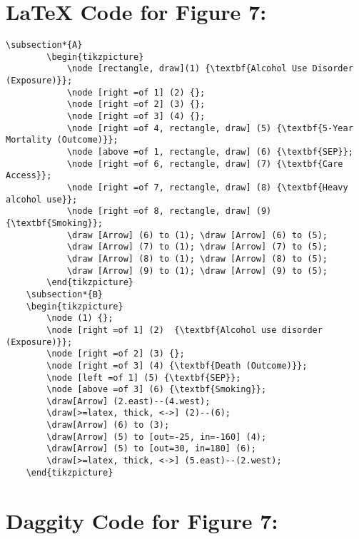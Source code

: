 \documentclass{article}
\begin{document}
\section*{\LaTeX\hspace*{1mm} Code for Figure 7:}
\begin{lstlisting}[frame=single, basicstyle=\ttfamily, linewidth=20.5cm]
        \subsection*{A}
        \begin{tikzpicture}
            \node [rectangle, draw](1) {\textbf{Alcohol Use Disorder (Exposure)}};
            \node [right =of 1] (2) {};
            \node [right =of 2] (3) {};
            \node [right =of 3] (4) {};
            \node [right =of 4, rectangle, draw] (5) {\textbf{5-Year Mortality (Outcome)}};
            \node [above =of 1, rectangle, draw] (6) {\textbf{SEP}};
            \node [right =of 6, rectangle, draw] (7) {\textbf{Care Access}};
            \node [right =of 7, rectangle, draw] (8) {\textbf{Heavy alcohol use}};
            \node [right =of 8, rectangle, draw] (9) {\textbf{Smoking}};
            \draw [Arrow] (6) to (1); \draw [Arrow] (6) to (5);
            \draw [Arrow] (7) to (1); \draw [Arrow] (7) to (5);
            \draw [Arrow] (8) to (1); \draw [Arrow] (8) to (5);
            \draw [Arrow] (9) to (1); \draw [Arrow] (9) to (5);
        \end{tikzpicture}
    \subsection*{B}
    \begin{tikzpicture}
        \node (1) {};
        \node [right =of 1] (2)  {\textbf{Alcohol use disorder (Exposure)}};
        \node [right =of 2] (3) {};
        \node [right =of 3] (4) {\textbf{Death (Outcome)}};
        \node [left =of 1] (5) {\textbf{SEP}};
        \node [above =of 3] (6) {\textbf{Smoking}};
        \draw[Arrow] (2.east)--(4.west);
        \draw[>=latex, thick, <->] (2)--(6);
        \draw[Arrow] (6) to (3);
        \draw[Arrow] (5) to [out=-25, in=-160] (4);
        \draw[Arrow] (5) to [out=30, in=180] (6);
        \draw[>=latex, thick, <->] (5.east)--(2.west);
    \end{tikzpicture}
    \end{lstlisting}

\section*{Daggity Code for Figure 7:}
\end{document}
